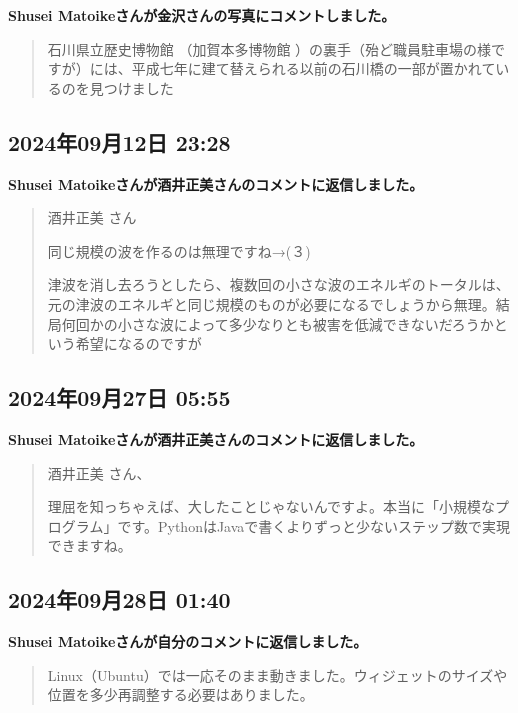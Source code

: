 \textbf{Shusei Matoikeさんが金沢さんの写真にコメントしました。}

\begin{quote}
石川県立歴史博物館 （加賀本多博物館 ）の裏手（殆ど職員駐車場の様ですが）には、平成七年に建て替えられる以前の石川橋の一部が置かれているのを見つけました
\end{quote}

\subsection*{2024年09月12日 23:28}

\textbf{Shusei Matoikeさんが酒井正美さんのコメントに返信しました。}

\begin{quote}
酒井正美 さん

同じ規模の波を作るのは無理ですね→(３)

津波を消し去ろうとしたら、複数回の小さな波のエネルギのトータルは、元の津波のエネルギと同じ規模のものが必要になるでしょうから無理。結局何回かの小さな波によって多少なりとも被害を低減できないだろうかという希望になるのですが
\end{quote}

\subsection*{2024年09月27日 05:55}

\textbf{Shusei Matoikeさんが酒井正美さんのコメントに返信しました。}

\begin{quote}
酒井正美 さん、

理屈を知っちゃえば、大したことじゃないんですよ。本当に「小規模なプログラム」です。PythonはJavaで書くよりずっと少ないステップ数で実現できますね。
\end{quote}

\subsection*{2024年09月28日 01:40}

\textbf{Shusei Matoikeさんが自分のコメントに返信しました。}

\begin{quote}
Linux（Ubuntu）では一応そのまま動きました。ウィジェットのサイズや位置を多少再調整する必要はありました。
\end{quote}

